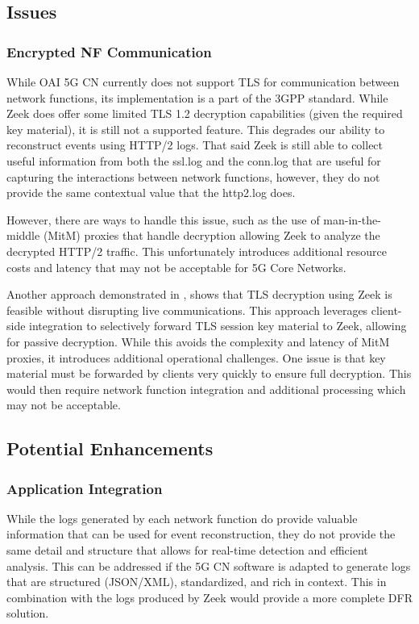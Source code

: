 \documentclass[final,1p,times,authoryear]{elsarticle}
\begin{document}
\subsection{Issues}
\label{sub5sec4}
\subsubsection{Encrypted NF Communication}
\label{sub5sub4sec1}
While OAI 5G CN currently does not support TLS for communication between network functions, its implementation is a part of the 3GPP standard. While Zeek does offer some limited TLS 1.2 decryption capabilities (given the required key material), it is still not a supported feature. This degrades our ability to reconstruct events using HTTP/2 logs. That said Zeek is still able to collect useful information from both the ssl.log and the conn.log that are useful for capturing the interactions between network functions, however, they do not provide the same contextual value that the http2.log does.

\vspace{1em}

However, there are ways to handle this issue, such as the use of man-in-the-middle (MitM) proxies that handle decryption allowing Zeek to analyze the decrypted HTTP/2 traffic. This unfortunately introduces additional resource costs and latency that may not be acceptable for 5G Core Networks.

\vspace{1em}

Another approach demonstrated in \citep{wilkens2022passive}, shows that TLS decryption using Zeek is feasible without disrupting live communications. This approach leverages client-side integration to selectively forward TLS session key material to Zeek, allowing for passive decryption. While this avoids the complexity and latency of MitM proxies, it introduces additional operational challenges. One issue is that key material must be forwarded by clients very quickly to ensure full decryption. This would then require network function integration and additional processing which may not be acceptable.

\subsection{Potential Enhancements}
\label{sub5sec5}
\subsubsection{Application Integration}
\label{sub5sub5sec1}
While the logs generated by each network function do provide valuable information that can be used for event reconstruction, they do not provide the same detail and structure that allows for real-time detection and efficient analysis. This can be addressed if the 5G CN software is adapted to generate logs that are structured (JSON/XML), standardized, and rich in context. This in combination with the logs produced by Zeek would provide a more complete DFR solution.
\end{document}
